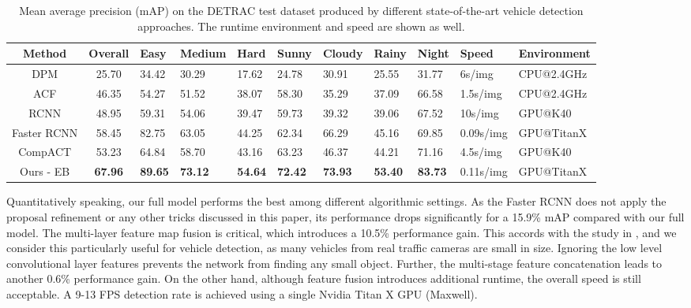 \documentclass[5pt]{article}
\begin{document}
\begin{table*}[t]
\small
\begin{center}
\begin{tabular}{c|c|P{0.35in}P{0.35in}P{0.35in}|P{0.35in}P{0.35in}P{0.35in}P{0.35in}|P{0.5in}P{0.85in}}
\hline
Method & Overall & Easy & Medium & Hard & Sunny & Cloudy & Rainy & Night & Speed & Environment\\
\hline
DPM \cite{felzenszwalb2010object}& 25.70 & 34.42 & 30.29 & 17.62 & 24.78 & 30.91 & 25.55 & 31.77 & 6s/img & CPU@2.4GHz \\
ACF \cite{dollar2014fast}& 46.35 & 54.27 & 51.52 & 38.07 & 58.30 & 35.29 & 37.09 & 66.58 & 1.5s/img & CPU@2.4GHz\\
RCNN \cite{girshick2014rich}& 48.95 & 59.31 & 54.06 & 39.47 & 59.73 & 39.32 & 39.06 & 67.52 & 10s/img & GPU@K40\\
Faster RCNN \cite{renNIPS15fasterrcnn} & 58.45 & 82.75 & 63.05 & 44.25 & 62.34 & 66.29 & 45.16 & 69.85 & 0.09s/img & GPU@TitanX\\
CompACT \cite{cai2015learning}& 53.23 & 64.84 & 58.70 & 43.16 & 63.23 & 46.37 & 44.21 & 71.16 & 4.5s/img & GPU@K40\\
Ours - EB& \textbf{67.96} & \textbf{89.65} & \textbf{73.12} & \textbf{54.64} & \textbf{72.42} & \textbf{73.93} & \textbf{53.40} & \textbf{83.73} & 0.11s/img & GPU@TitanX\\
\hline
\end{tabular}
\end{center}
\vspace{-0.1in}
\caption{Mean average precision (mAP) on the DETRAC test dataset produced by different state-of-the-art vehicle detection approaches. The runtime environment and speed are shown as well. }
\label{tb:all}
\vspace{-0.1in}
\end{table*}
Quantitatively speaking, our full model performs the best among different algorithmic settings. As the Faster RCNN does not apply the proposal refinement or any other tricks discussed in this paper, its performance drops significantly for a 15.9\% mAP compared with our full model. The multi-layer feature map fusion is critical, which introduces a 10.5\% performance gain. This accords with the study in \cite{ghodrati2015deepproposal}, and we consider this particularly useful for vehicle detection, as many vehicles from real traffic cameras are small in size. Ignoring the low level convolutional layer features prevents the network from finding any small object.  Further, the multi-stage feature concatenation leads to another 0.6\% performance gain. On the other hand, although feature fusion introduces additional runtime, the overall speed is still acceptable. A 9-13 FPS detection rate is achieved using a single Nvidia Titan X GPU (Maxwell).
\end{document}
